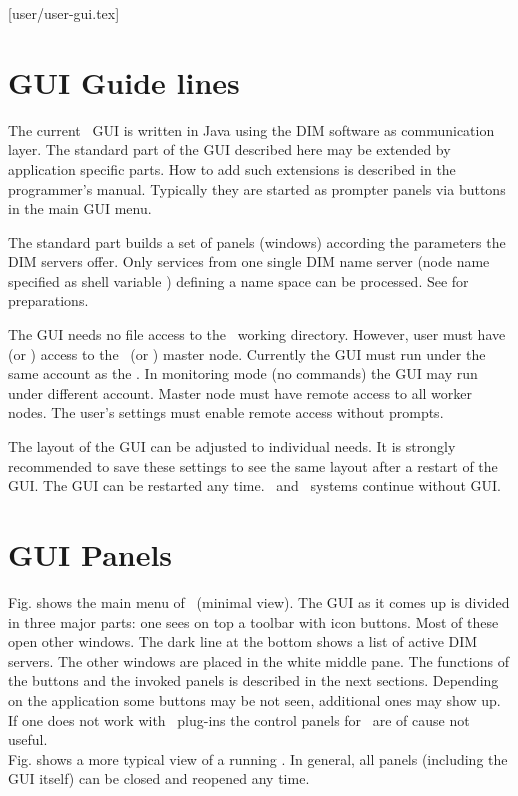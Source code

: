 [user/user-gui.tex]
\label{user-gui-chapter}
\section{GUI Guide lines}
The current \dabc\ GUI is written in Java using the DIM software as communication layer.
The standard part of the GUI described here may be extended by application specific parts.
How to add such extensions is described in the programmer's manual.
Typically they are started as prompter panels via buttons in the
main GUI menu. 

The standard part builds a set of panels (windows) according the parameters
the DIM servers offer. Only services from one single DIM name server
(node name specified as shell variable )
defining a name space can be processed.
See  for preparations.

The GUI needs no file access to the \dabc\ working directory.
However, user must have  (or ) access to
the \dabc\ (or \mbs) master node.
Currently the GUI must run under the same account as the \dabc.
In monitoring mode (no commands) the GUI may run under different account.
Master node must have remote access to all worker nodes.
The user's  settings must enable remote access without
prompts.

The layout of the GUI can be adjusted to individual needs.
It is strongly recommended to save these settings to see the same layout
after a restart of the GUI. The GUI can be restarted any time.
\dabc\ and \mbs\ systems continue without GUI.

\section{GUI Panels}
Fig.  shows the main menu of \dabc\ (minimal view).
The GUI as it comes up is divided in three major parts: 
one sees on top a toolbar with icon buttons. Most of these open
other windows. The dark line at the bottom shows a list of active DIM servers.
The other windows are placed in the white middle pane. The functions of the buttons and the
invoked panels is described in the next sections.
Depending on the application some buttons may be not seen, additional ones may show up.
If one does not work with \mbs\ plug-ins the control panels for \mbs\
are of cause not useful.\\
Fig. \paref{fig:user-gui-full-screen} shows a more typical view of a running \dabc.
In general, all panels (including the GUI itself) can be closed and reopened any time.

